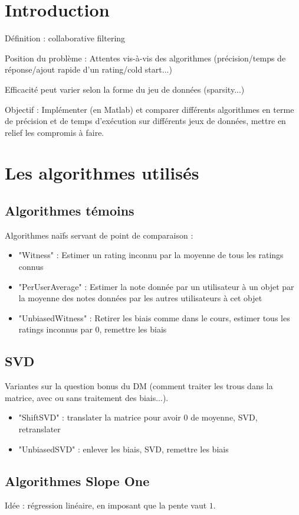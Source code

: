 \documentclass[11pt, openany, a4paper]{article}
\begin{document}
\section*{Introduction}

Définition : collaborative filtering

Position du problème : 
Attentes vis-à-vis des algorithmes (précision/temps de réponse/ajout rapide d'un rating/cold start...)

Efficacité peut varier selon la forme du jeu de données (sparsity...)

Objectif : Implémenter (en Matlab) et comparer différents algorithmes en terme de précision et de temps d'exécution sur différents jeux de données, mettre en relief les compromis à faire.

\section{Les algorithmes utilisés}
	\subsection{Algorithmes témoins}
		Algorithmes naïfs servant de point de comparaison : 
			\begin{itemize}
				\item{"Witness" : Estimer un rating inconnu par la moyenne de tous les ratings connus}
				\item{"PerUserAverage" : Estimer la note donnée par un utilisateur à un objet par la moyenne des notes données par les autres utilisateurs à cet objet}
				\item{"UnbiasedWitness" : Retirer les biais comme dans le cours, estimer tous les ratings inconnus par $0$, remettre les biais}
			\end{itemize}
	\subsection{SVD}
		Variantes sur la question bonus du DM (comment traiter les trous dans la matrice, avec ou sans traitement des biais...).
		\begin{itemize}
			\item{"ShiftSVD" : translater la matrice pour avoir $0$ de moyenne, SVD, retranslater}
			\item{"UnbiasedSVD" : enlever les biais, SVD, remettre les biais}
		\end{itemize}
	\subsection{Algorithmes Slope One}
		Idée : régression linéaire, en imposant que la pente vaut $1$.
		
\end{document}
